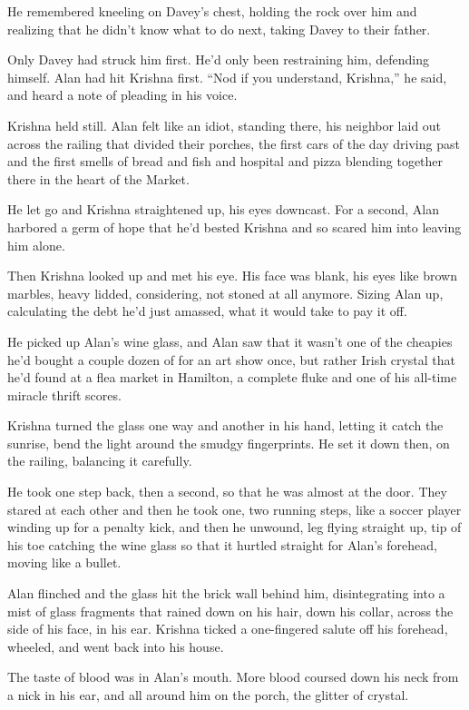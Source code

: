 He remembered kneeling on Davey's chest, holding the rock over him and
realizing that he didn't know what to do next, taking Davey to their
father.

Only Davey had struck him first.  He'd only been restraining him,
defending himself.  Alan had hit Krishna first.  ``Nod if you
understand, Krishna,'' he said, and heard a note of pleading in his
voice.

Krishna held still.  Alan felt like an idiot, standing there, his
neighbor laid out across the railing that divided their porches, the
first cars of the day driving past and the first smells of bread and
fish and hospital and pizza blending together there in the heart of
the Market.

He let go and Krishna straightened up, his eyes downcast.  For a
second, Alan harbored a germ of hope that he'd bested Krishna and so
scared him into leaving him alone.

Then Krishna looked up and met his eye.  His face was blank, his eyes
like brown marbles, heavy lidded, considering, not stoned at all
anymore.  Sizing Alan up, calculating the debt he'd just amassed, what
it would take to pay it off.

He picked up Alan's wine glass, and Alan saw that it wasn't one of the
cheapies he'd bought a couple dozen of for an art show once, but
rather Irish crystal that he'd found at a flea market in Hamilton, a
complete fluke and one of his all-time miracle thrift scores.

Krishna turned the glass one way and another in his hand, letting it
catch the sunrise, bend the light around the smudgy fingerprints.  He
set it down then, on the railing, balancing it carefully.

He took one step back, then a second, so that he was almost at the
door.  They stared at each other and then he took one, two running
steps, like a soccer player winding up for a penalty kick, and then he
unwound, leg flying straight up, tip of his toe catching the wine
glass so that it hurtled straight for Alan's forehead, moving like a
bullet.

Alan flinched and the glass hit the brick wall behind him,
disintegrating into a mist of glass fragments that rained down on his
hair, down his collar, across the side of his face, in his ear. 
Krishna ticked a one-fingered salute off his forehead, wheeled, and
went back into his house.

The taste of blood was in Alan's mouth.  More blood coursed down his
neck from a nick in his ear, and all around him on the porch, the
glitter of crystal.

